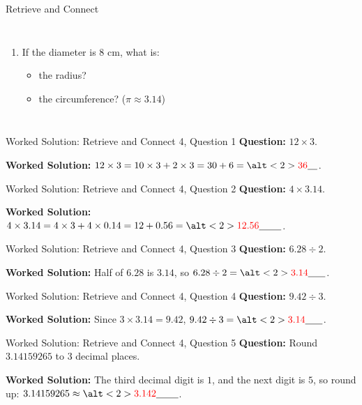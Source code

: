 \documentclass{beamer}
\newcommand{\ablank}[1]{%
  \alt<2>{\textcolor{red}{#1}}{\underline{\phantom{#1}}}%
}
\newcommand{\ashow}[1]{\uncover<2->{\textcolor{red}{\small #1}}}
\begin{document}
\begin{frame}{Retrieve and Connect}
\begin{columns}
\begin{enumerate}
  \item If the diameter is $8$ cm, what is:
    \begin{itemize}
      \item the radius? \ashow{$4$ cm}
      \item the circumference? ($\pi \approx 3.14$) \ashow{$25.12$ cm}
    \end{itemize}
 
\end{enumerate}

\end{columns}
\end{frame}

\begin{frame}{Worked Solution: Retrieve and Connect 4, Question 1}
\hypertarget{work-st4}{}
\small
\textbf{Question:} \(12\times3\).

\textbf{Worked Solution:} \(12\times3=10\times3+2\times3=30+6=\ablank{36}\).
\end{frame}

\begin{frame}{Worked Solution: Retrieve and Connect 4, Question 2}
\small
\textbf{Question:} \(4\times3.14\).

\textbf{Worked Solution:} \(4\times3.14=4\times3+4\times0.14=12+0.56=\ablank{12.56}\).
\end{frame}

\begin{frame}{Worked Solution: Retrieve and Connect 4, Question 3}
\small
\textbf{Question:} \(6.28\div2\).

\textbf{Worked Solution:} Half of \(6.28\) is \(3.14\), so \(6.28\div2=\ablank{3.14}\).
\end{frame}

\begin{frame}{Worked Solution: Retrieve and Connect 4, Question 4}
\small
\textbf{Question:} \(9.42\div3\).

\textbf{Worked Solution:} Since \(3\times3.14=9.42\), \(9.42\div3=\ablank{3.14}\).
\end{frame}

\begin{frame}{Worked Solution: Retrieve and Connect 4, Question 5}
\small
\textbf{Question:} Round \(3.14159265\) to 3 decimal places.

\textbf{Worked Solution:} The third decimal digit is \(1\), and the next digit is \(5\), so round up:
\(3.14159265\approx\ablank{3.142}\).
\end{frame}
\end{document}

